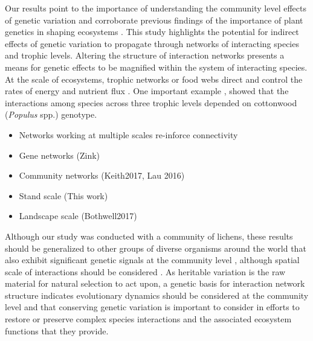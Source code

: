 \documentclass[fleqn,10pt]{wlscirep}
\begin{document}
Our results point to the importance of understanding the community
level effects of genetic variation and corroborate previous findings
of the importance of plant genetics in shaping ecosystems
\cite{Whitham2006a}.  This study highlights the potential for indirect
effects of genetic variation to propagate through networks of
interacting species and trophic levels. Altering the structure of
interaction networks presents a means for genetic effects to be
magnified within the system of interacting species. At the scale of
ecosystems, trophic networks or food webs direct and control the rates
of energy and nutrient flux \cite{Borgatti2006}. One important example
\cite{Smith2011}, showed that the interactions among species across
three trophic levels depended on cottonwood (\textit{Populus} spp.)
genotype. 

\begin{itemize}
\item Networks working at multiple scales re-inforce connectivity
\item Gene networks (Zink)
\item Community networks (Keith2017, Lau 2016)
\item Stand scale (This work)
\item Landscape scale (Bothwell2017)
\end{itemize}

Although our study was conducted with a community of
lichens, these results should be generalized to other groups of
diverse organisms around the world that also exhibit significant
genetic signals at the community level \cite{Rowntree2011,
  Whitham2012}, although spatial scale of interactions should be
considered \cite{Zook2010}. As heritable variation is the raw material
for natural selection to act upon, a genetic basis for interaction
network structure indicates evolutionary dynamics should be considered
at the community level and that conserving genetic variation is
important to consider in efforts to restore or preserve complex
species interactions and the associated ecosystem functions
\cite{Evans2013} that they provide.







\end{document}
